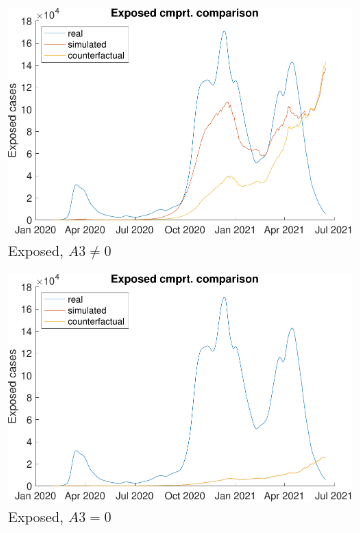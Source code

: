 \begin{figure}[hbtp]
     \centering
     \begin{subfigure}[b]{.45\linewidth}
         \centering
         \includegraphics[width=\linewidth]{img/210907_171119_combined_wave0/figures/COMP_exp}
         \caption{Exposed, $A3 \neq 0$}
         \label{fig:compAggrCombWave0Exp}
     \end{subfigure}
     \hfill
     \begin{subfigure}[b]{.45\linewidth}
         \centering
         \includegraphics[width=\linewidth]{img/210907_180927_combined_wave0_noa3/figures/COMP_exp}
         \caption{Exposed, $A3 = 0$}
         \label{fig:compAggrCombWave0NoA3Exp}
     \end{subfigure}
     \newline
     \begin{subfigure}[b]{.45\linewidth}
         \centering

\end{subfigure}
\end{figure}
